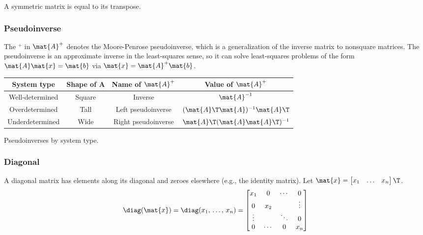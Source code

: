 A symmetric matrix is equal to its transpose.

\subsubsection{Pseudoinverse}
The $^+$ in $\mat{A}^+$ denotes the Moore-Penrose pseudoinverse, which is a
generalization of the inverse matrix to nonsquare matrices. The pseudoinverse is
an approximate inverse in the least-squares sense, so it can solve least-squares
problems of the form $\mat{A}\mat{x} = \mat{b}$ via
$\mat{x} = \mat{A}^+\mat{b}$.
\begin{booktable}
  \begin{tabular}{|cccc|}
    \hline
    \rowcolor{headingbg}
    \textbf{System type} & \textbf{Shape of A} & \textbf{Name of }$\mat{A}^+$ &
      \textbf{Value of }$\mat{A}^+$ \\
    \hline
    Well-determined & Square & Inverse &
      $\mat{A}^{-1}$ \\
    Overdetermined & Tall & Left pseudoinverse &
      $(\mat{A}\T\mat{A})^{-1}\mat{A}\T$ \\
    Underdetermined & Wide & Right pseudoinverse &
      $\mat{A}\T(\mat{A}\mat{A}\T)^{-1}$ \\
    \hline
  \end{tabular}
  \caption{Pseudoinverses by system type.}
\end{booktable}

\subsubsection{Diagonal}
A diagonal matrix has elements along its diagonal and zeroes elsewhere (e.g.,
the identity matrix). Let
$\mat{x} = \begin{bmatrix}x_1 & \ldots & x_n\end{bmatrix}\T$.
\begin{equation*}
  \diag(\mat{x}) = \diag(x_1,\, \ldots,\, x_n) =
  \begin{bmatrix}
    x_1 & 0 & \cdots & 0 \\
    0 & x_2 & & \vdots \\
    \vdots & & \ddots & 0 \\
    0 & \cdots & 0 & x_n
  \end{bmatrix}
\end{equation*}

